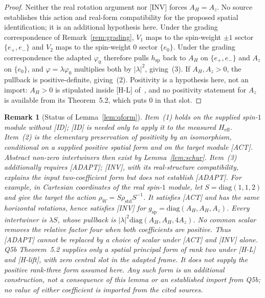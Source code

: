 \documentclass[11pt,a4paper]{article}
\newtheorem{remark}[theorem]{Remark}
\newcommand{\Heff}{H_{\mathrm{eff}}}
\begin{document}
\begin{proof}
      Neither the real rotation argument nor [INV] forces $A_H=A_z$.
      No source establishes this action and real-form compatibility for the proposed spatial
      identification; it is an additional hypothesis here.
      Under the grading correspondence of Remark~\ref{rem:grading}, $V_1$ maps to the spin-weight
      $\pm 1$ sector $\{e_+, e_-\}$ and $V_2$ maps to the spin-weight $0$ sector $\{e_0\}$.
      Under the grading correspondence the adapted $\varphi_0$ therefore pulls $h_{\mathrm{sp}}$
      back to $A_H$ on $\{e_+, e_-\}$ and $A_z$ on $\{e_0\}$, and
      $\varphi = \lambda\varphi_0$ multiplies both by $|\lambda|^2$, giving~(3).
      If $A_H, A_z > 0$, the pullback is positive-definite, giving~(2).
      Positivity is a hypothesis here, not an import: $A_H > 0$ is stipulated inside [H-L]
      of~\cite{Beau2026q5b}, and no positivity statement for $A_z$ is available from its
      Theorem~5.2, which puts $0$ in that slot.
    \end{proof}

    \begin{remark}[Status of Lemma~\ref{lem:qform}]
      \label{rem:status}
      Item~(1) holds on the supplied spin-$1$ module without [ID]; [ID] is needed only to
      apply it to the measured $\Heff$.
      Item~(2) is the elementary preservation of positivity by an isomorphism, conditional on
      a supplied positive spatial form and on the target module [ACT].
      Abstract non-zero intertwiners then exist by Lemma~\ref{lem:schur}.
      Item~(3) additionally requires [ADAPT]; [INV], with its real-structure compatibility,
      explains the input two-coefficient form but does not establish [ADAPT].
      For example, in Cartesian coordinates of the real spin-$1$ module, let
      $S=\mathrm{diag}(1,1,2)$ and give the target the action
      $\rho_W=S\rho_{\mathrm{std}}S^{-1}$.
      It satisfies [ACT] and has the same horizontal rotations, hence satisfies [INV] for
      $g_{\mathrm{sp}}=\mathrm{diag}(A_H,A_H,A_z)$.
      Every intertwiner is $\lambda S$, whose pullback is
      $|\lambda|^2\mathrm{diag}(A_H,A_H,4A_z)$.
      No common scalar removes the relative factor four when both coefficients are positive.
      Thus [ADAPT] cannot be replaced by a choice of scalar under [ACT] and [INV] alone.
      Q5b Theorem~5.2 supplies only a spatial principal form of rank two under [H-L] and
      [H-lift], with zero central slot in the adapted frame.
      It does not supply the positive rank-three form assumed here.
      Any such form is an additional construction, not a consequence of this lemma or an
      established import from Q5b; no value of either coefficient is imported from the cited sources.
    \end{remark}
\end{document}
